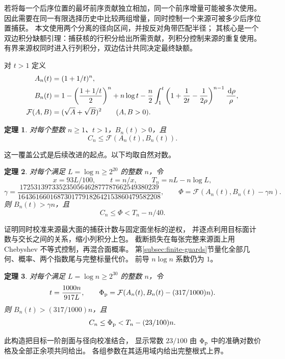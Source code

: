 \documentclass[UTF8,a4paper,11pt,fontset=fandol]{ctexart}
\newtheorem{theorem}{定理}
\theoremstyle{remark}
\newcommand{\dint}{\,\mathrm d}
\newcommand{\Fcal}{\mathcal F}
\begin{document}
若将每一个后序位置的最坏前序贡献独立相加，同一个前序增量可能被多次使用。
因此需要在同一有限选择历史中比较两组增量，同时控制一个来源可被多少后序位置捕获。
本文使用两个分离的径向区间，并按反对角带匹配半径；
其核心是一个双边积分缺额引理：捕获核的行积分给出所需贡献，列积分控制来源的重复使用。
有界来源权同时进入行列积分，双边估计共同决定最终缺额。

对 $t>1$ 定义
\begin{align}
 A_n(t)&=(1+1/t)^n,\label{eq:A}\\
 B_n(t)&=1-\left(\frac{1+1/t}{2}\right)^n+n\log t
 -\frac n2\int_1^t\left(1+\frac1{2t}-\frac1{2\rho}\right)^{n-1}
                         \frac{\dint\rho}{\rho},\label{eq:B}\\
 \Fcal(A,B)&=(\sqrt A+\sqrt B)^2\qquad(A,B>0).\notag
\end{align}
\begin{theorem}\label{thm:main}
对每个整数 $n\ge1$、$t>1$，$B_n(t)>0$，且
\begin{equation}\label{eq:main}
 C_n\le\Fcal(A_n(t),B_n(t)).
\end{equation}
\end{theorem}
这一覆盖公式是后续改进的起点。以下均取自然对数。
\begin{theorem}\label{thm:explicit}
对每个满足 $L=\log n\ge2^{20}$ 的整数 $n$，令
\[
 x=93L/100,\qquad t=n/x,\qquad T_n=nL-n\log L,
\]
\[
 \gamma=\frac{172531397335235056462877787662549380239}
 {1643616601687301779182642153860479582208},\qquad
 \Phi=\Fcal(A_n(t),B_n(t)-\gamma n).
\]
则 $B_n(t)>\gamma n$，且
\begin{equation}\label{eq:main-explicit}
 C_n\le\Phi<T_n-n/40.
\end{equation}
\end{theorem}
证明同时校准来源最大面的捕获计数与固定面坐标的逆权，
并逐点利用目标面计数与交长之间的关系，缩小列积分上包。
截断损失在每张完整来源面上用 Chebyshev 不等式控制，再混合面概率。
第\ref{subsec:finite-guards}节量化全部几何、概率、两个指数尾与完整标量代价。
前导 $n\log n$ 系数仍为 $1$。

\begin{theorem}\label{thm:profile}
对每个满足 $L=\log n\ge2^{30}$ 的整数 $n$，令
\[
 t=\frac{1000n}{917L},\qquad
 \Phi_{\rm p}=\Fcal(A_n(t),B_n(t)-(317/1000)n).
\]
则 $B_n(t)>(317/1000)n$，且
\[
 C_n\le\Phi_{\rm p}<T_n-(23/100)n.
\]
\end{theorem}
此构造把目标一阶剖面与径向校准结合，
显示常数 $23/100$ 由 $\Phi_{\rm p}$ 中的准确对数价格及全部正余项共同给出。
各组参数在其适用域内给出完整根式上界。
\end{document}
